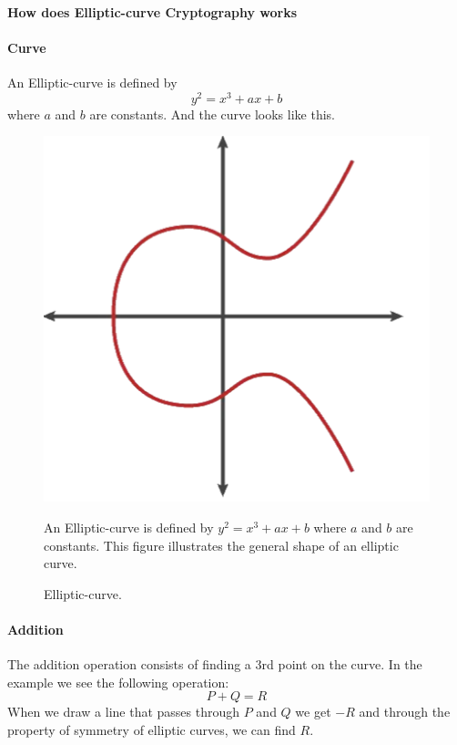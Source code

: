 \paragraph{How does Elliptic-curve Cryptography works}\cite{pierce_ecdh}
\paragraph{Curve}
An Elliptic-curve is defined by 
\begin{equation*}
y^2 = x^3 + ax + b
\end{equation*}
where $a$ and $b$ are constants. And the curve looks like this.

\begin{figure}[H]
\begin{minipage}{0.5\textwidth}
  \centering
  \includegraphics[width=\linewidth]{images/curve.png}
  \caption{Elliptic-curve.}
  \label{fig:Elliptic curve}
\end{minipage}%
\begin{minipage}{0.5\textwidth}
An Elliptic-curve is defined by $y^2 = x^3 + ax + b$ where $a$ and $b$ are constants. This figure illustrates the general shape of an elliptic curve.
\end{minipage}
\end{figure}

\paragraph{Addition}
The addition operation consists of finding a 3rd point on the curve. In the example we see the following operation:
\begin{equation}
P + Q = R
\end{equation}
When we draw a line that passes through $P$ and $Q$ we get $-R$ and through the property of symmetry of elliptic curves, we can find $R$.


